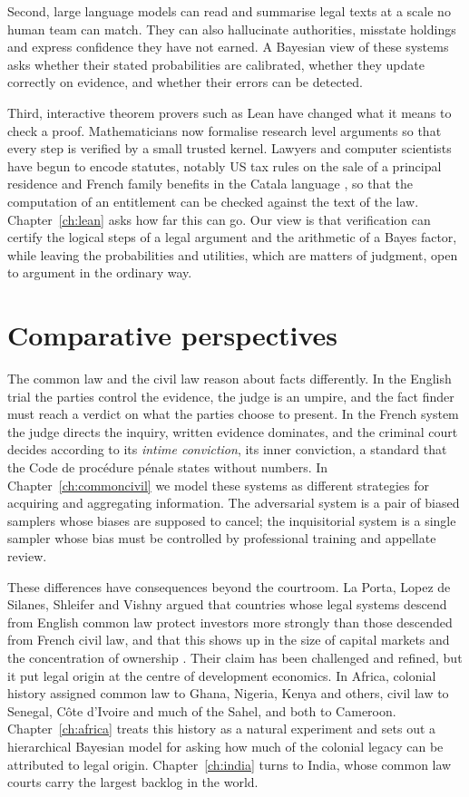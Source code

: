 Second, large language models can read and summarise legal texts at a scale no human team can match. They can also hallucinate authorities, misstate holdings and express confidence they have not earned. A Bayesian view of these systems asks whether their stated probabilities are calibrated, whether they update correctly on evidence, and whether their errors can be detected.

Third, interactive theorem provers such as Lean have changed what it means to check a proof. Mathematicians now formalise research level arguments so that every step is verified by a small trusted kernel. Lawyers and computer scientists have begun to encode statutes, notably US tax rules on the sale of a principal residence and French family benefits in the Catala language \citep{merigoux2021}, so that the computation of an entitlement can be checked against the text of the law. Chapter~\ref{ch:lean} asks how far this can go. Our view is that verification can certify the logical steps of a legal argument and the arithmetic of a Bayes factor, while leaving the probabilities and utilities, which are matters of judgment, open to argument in the ordinary way.

\section{Comparative perspectives}

The common law and the civil law reason about facts differently. In the English trial the parties control the evidence, the judge is an umpire, and the fact finder must reach a verdict on what the parties choose to present. In the French system the judge directs the inquiry, written evidence dominates, and the criminal court decides according to its \emph{intime conviction}, its inner conviction, a standard that the Code de proc\'edure p\'enale states without numbers. In Chapter~\ref{ch:commoncivil} we model these systems as different strategies for acquiring and aggregating information. The adversarial system is a pair of biased samplers whose biases are supposed to cancel; the inquisitorial system is a single sampler whose bias must be controlled by professional training and appellate review.

These differences have consequences beyond the courtroom. La Porta, Lopez de Silanes, Shleifer and Vishny argued that countries whose legal systems descend from English common law protect investors more strongly than those descended from French civil law, and that this shows up in the size of capital markets and the concentration of ownership \citep{llsv1997,llsv1998}. Their claim has been challenged and refined, but it put legal origin at the centre of development economics. In Africa, colonial history assigned common law to Ghana, Nigeria, Kenya and others, civil law to Senegal, C\^ote d'Ivoire and much of the Sahel, and both to Cameroon. Chapter~\ref{ch:africa} treats this history as a natural experiment and sets out a hierarchical Bayesian model for asking how much of the colonial legacy can be attributed to legal origin. Chapter~\ref{ch:india} turns to India, whose common law courts carry the largest backlog in the world.

